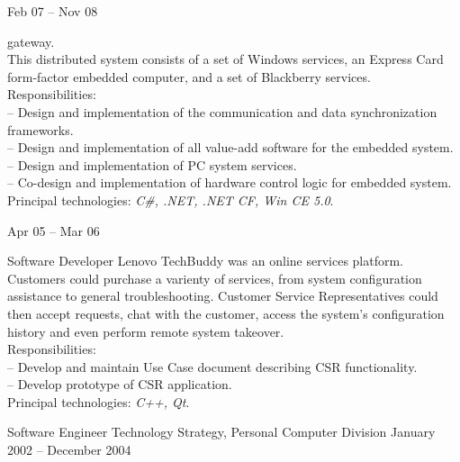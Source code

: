 \documentclass[letterpaper, 11pt]{article}
\begin{document}
\begin{resume}
\begin{subcategory}{Feb 07 -- Nov 08}
\begin{block}
                gateway.
                \\[1ex]
                This distributed system consists of a set of Windows services, an Express Card
                form-factor embedded computer, and a set of Blackberry services.
                \\[1ex]
                Responsibilities: \\
                -- Design and implementation of the communication and data synchronization frameworks. \\
                -- Design and implementation of all value-add software for the embedded system. \\
                -- Design and implementation of PC system services. \\
                -- Co-design and implementation of hardware control logic for embedded system.
                \\[1ex]
                Principal technologies: \emph{C\#, .NET, .NET CF, Win CE 5.0}.
                \bigskip
            \end{block}
        \end{subcategory}
        \begin{subcategory}{Apr 05 -- Mar 06}
            \begin{block}
                 {Software Developer}
                Lenovo TechBuddy was an online services platform.  Customers could purchase
                a varienty of services, from system configuration assistance to general
                troubleshooting.  Customer Service Representatives could then accept requests,
                chat with the customer, access the system's configuration history and even
                perform remote system takeover.
                \\[1ex]
                Responsibilities: \\
                -- Develop and maintain Use Case document describing CSR functionality. \\
                -- Develop prototype of CSR application.
                \\[1ex]
                Principal technologies: \emph{C++, Qt}.
                \bigskip
            \end{block}
        \end{subcategory}
        \begin{category}{}
                                                         {Software Engineer}
                     {Technology Strategy, Personal Computer Division} {January 2002 -- December 2004}

\end{category}
\end{resume}
\end{document}

